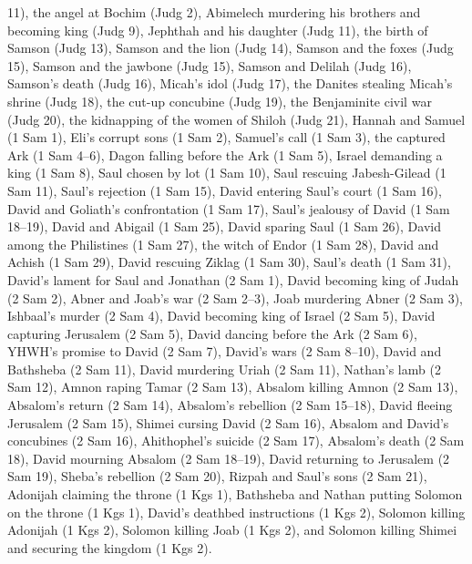 {{{11), the angel at Bochim (Judg 2), Abimelech murdering his brothers and becoming king (Judg 9), Jephthah and his daughter (Judg 11), the birth of Samson (Judg 13), Samson and the lion (Judg 14), Samson and the foxes (Judg 15), Samson and the jawbone (Judg 15), Samson and Delilah (Judg 16), Samson’s death (Judg 16), Micah’s idol (Judg 17), the Danites stealing Micah’s shrine (Judg 18), the cut-up concubine (Judg 19), the Benjaminite civil war (Judg 20), the kidnapping of the women of Shiloh (Judg 21), Hannah and Samuel (1 Sam 1), Eli’s corrupt sons (1 Sam 2), Samuel’s call (1 Sam 3), the captured Ark (1 Sam 4–6), Dagon falling before the Ark (1 Sam 5), Israel demanding a king (1 Sam 8), Saul chosen by lot (1 Sam 10), Saul rescuing Jabesh-Gilead (1 Sam 11), Saul’s rejection (1 Sam 15), David entering Saul’s court (1 Sam 16), David and Goliath’s confrontation (1 Sam 17), Saul’s jealousy of David (1 Sam 18–19), David and Abigail (1 Sam 25), David sparing Saul (1 Sam 26), David among the Philistines (1 Sam 27), the witch of Endor (1 Sam 28), David and Achish (1 Sam 29), David rescuing Ziklag (1 Sam 30), Saul’s death (1 Sam 31), David’s lament for Saul and Jonathan (2 Sam 1), David becoming king of Judah (2 Sam 2), Abner and Joab’s war (2 Sam 2–3), Joab murdering Abner (2 Sam 3), Ishbaal’s murder (2 Sam 4), David becoming king of Israel (2 Sam 5), David capturing Jerusalem (2 Sam 5), David dancing before the Ark (2 Sam 6), YHWH’s promise to David (2 Sam 7), David’s wars (2 Sam 8–10), David and Bathsheba (2 Sam 11), David murdering Uriah (2 Sam 11), Nathan’s lamb (2 Sam 12), Amnon raping Tamar (2 Sam 13), Absalom killing Amnon (2 Sam 13), Absalom’s return (2 Sam 14), Absalom’s rebellion (2 Sam 15–18), David fleeing Jerusalem (2 Sam 15), Shimei cursing David (2 Sam 16), Absalom and David’s concubines (2 Sam 16), Ahithophel’s suicide (2 Sam 17), Absalom’s death (2 Sam 18), David mourning Absalom (2 Sam 18–19), David returning to Jerusalem (2 Sam 19), Sheba’s rebellion (2 Sam 20), Rizpah and Saul’s sons (2 Sam 21), Adonijah claiming the throne (1 Kgs 1), Bathsheba and Nathan putting Solomon on the throne (1 Kgs 1), David’s deathbed instructions (1 Kgs 2), Solomon killing Adonijah (1 Kgs 2), Solomon killing Joab (1 Kgs 2), and Solomon killing Shimei and securing the kingdom (1 Kgs 2).

		}
	}





}

